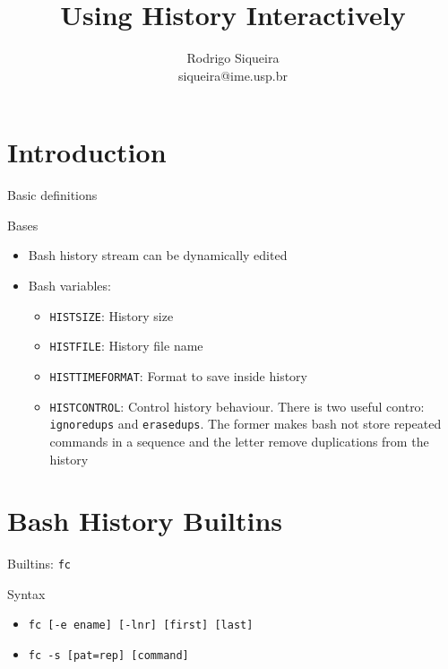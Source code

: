 \documentclass[10pt, compress, aspectratio=169]{beamer}
\title{Using History Interactively}
\author{\footnotesize Rodrigo Siqueira \\ {\scriptsize siqueira@ime.usp.br}}
\begin{document}
\maketitle

\section{Introduction}
\begin{frame}{Basic definitions}
  \begin{exampleblock}{Bases}
    \begin{itemize}
      \item Bash history stream can be dynamically edited
      \item Bash variables:
				\begin{itemize}
					\item \texttt{HISTSIZE}: History size
					\item \texttt{HISTFILE}: History file name
					\item \texttt{HISTTIMEFORMAT}: Format to save inside history
					\item \texttt{HISTCONTROL}: Control history behaviour. There is two
								useful contro: \texttt{ignoredups} and \texttt{erasedups}. The
								former makes bash not store repeated commands in a sequence and
								the letter remove duplications from the history
				\end{itemize}
    \end{itemize}
  \end{exampleblock}
\end{frame}

\section{Bash History Builtins}

\begin{frame}{Builtins: \texttt{fc}}
  \begin{alertblock}{Syntax}
    \begin{itemize}
      \item \texttt{fc [-e ename] [-lnr] [first] [last]}
      \item \texttt{fc -s [pat=rep] [command]}
    \end{itemize}
  \end{alertblock}
\end{frame}
\end{document}
